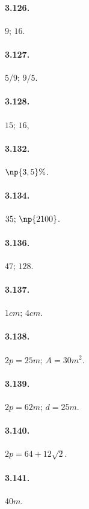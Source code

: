 \begin{multicols}{3}
\paragraph{3.126.}$ 9;\, 16 $.

\paragraph{3.127.}$ 5/9;\, 9/5 $.

\paragraph{3.128.}$ 15;\, 16 $,

\paragraph{3.132.}$ \np{3,5}\% $.

\paragraph{3.134.}$ 35;\, \np{2100} $.

\paragraph{3.136.}$ 47;\, 128 $.

\paragraph{3.137.}$ 1\unit{cm};\, 4\unit{cm} $.

\paragraph{3.138.}$ 2p=25\unit{m};\, A=30\unit{m^2} $.

\paragraph{3.139.}$ 2p=62\unit{m};\, d=25\unit{m} $.

\paragraph{3.140.}$ 2p = 64 + 12 \sqrt{2} $.

\paragraph{3.141.}$ 40\unit{m} $.


\end{multicols}
